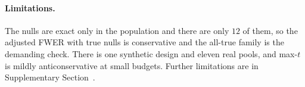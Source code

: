 \paragraph{Limitations.} The nulls are exact only in the population and there are only $12$ of them, so the adjusted FWER with true nulls is conservative and the all-true family is the demanding check. There is one synthetic design and eleven real pools, and max-$t$ is mildly anticonservative at small budgets. Further limitations are in Supplementary Section~.
